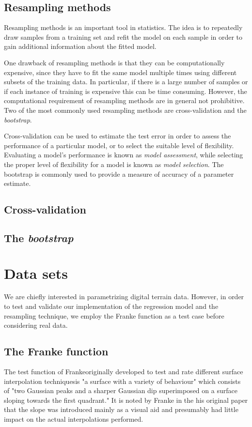 \documentclass[a4paper]{article}
\begin{document}
\begin{multicols}{2}
\subsection{Resampling methods \label{sect:resampling}}
Resampling methods is an important tool in statistics. The idea is to repeatedly draw samples from a training set and refit 
the model on each sample in order to gain additional information about the fitted model.

One drawback of resampling methods is that they can be computationally expensive, since they have to fit the same model 
multiple times using different subsets of the training data. In particular, if there is a large number of samples or if 
each instance of training is expensive this can be time consuming. However, the computational requirement of resampling methods 
are in general not prohibitive. Two of the most commonly used resampling methods are cross-validation and 
the \textit{bootstrap}.

Cross-validation can be used to estimate the test error in order to assess the performance of a particular model, or to select 
the suitable level of flexibility. Evaluating a model's performance is known as \textit{model assessment}, while selecting the 
proper level of flexibility for a model is known as \textit{model selection}. The bootstrap is commonly used to provide 
a measure of accuracy of a parameter estimate.

\subsection{Cross-validation}
\lipsum[4]
\subsection{The \textit{bootstrap}}
\lipsum[2]

\section{Data sets}
We are chiefly interested in parametrizing digital terrain data. However, in order to test and validate our implementation of the regression model and the resampling technique, we employ the Franke function\autocite{franke1979critical} as a test case before considering real data.

\subsection{The Franke function \label{sect:franke}}
The test function of Franke\textemdash originally developed to test and rate different surface interpolation techniques\textemdash is "a surface with a variety of behaviour" which consists of "two Gaussian peaks and a sharper Gaussian dip superimposed on a surface sloping towards the first quadrant."\autocite{franke1979critical} It is noted by Franke in the his original paper that the slope was introduced mainly as a visual aid and presumably had little impact on the actual interpolations performed. 


\end{multicols}
\end{document}
